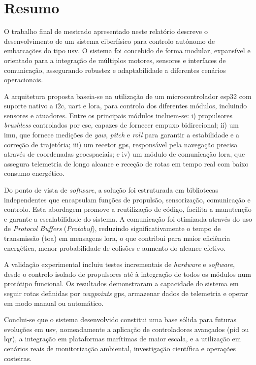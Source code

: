 
\chapter{Resumo}

O trabalho final de mestrado apresentado neste relatório descreve o desenvolvimento de um sistema ciberfísico para controlo autónomo de embarcações do tipo \acrfull{usv}. O sistema foi concebido de forma modular, expansível e orientado para a integração de múltiplos motores, sensores e interfaces de comunicação, assegurando robustez e adaptabilidade a diferentes cenários operacionais.

A arquitetura proposta baseia-se na utilização de um microcontrolador \gls{esp32} com suporte nativo a \gls{i2c}, \gls{uart} e \gls{lora}, para controlo dos diferentes módulos, incluindo sensores e atuadores. Entre os principais módulos incluem-se: i) propulsores \emph{brushless} controlados por \acrfull{esc}, capazes de fornecer empuxo bidirecional; ii) um \acrfull{imu}, que fornece medições de \emph{yaw}, \emph{pitch} e \emph{roll} para garantir a estabilidade e a correção de trajetória; iii) um recetor \acrfull{gps}, responsável pela navegação precisa através de coordenadas geoespaciais; e iv) um módulo de comunicação \acrfull{lora}, que assegura telemetria de longo alcance e receção de rotas em tempo real com baixo consumo energético.

Do ponto de vista de \emph{software}, a solução foi estruturada em bibliotecas independentes que encapsulam funções de propulsão, sensorização, comunicação e controlo. Esta abordagem promove a reutilização de código, facilita a manutenção e garante a escalabilidade do sistema. A comunicação foi otimizada através do uso de \emph{Protocol Buffers} (\emph{Protobuf}), reduzindo significativamente o tempo de transmissão (\gls{toa}) em mensagens \acrfull{lora}, o que contribui para maior eficiência energética, menor probabilidade de colisões e aumento do alcance efetivo.

A validação experimental incluiu testes incrementais de \emph{hardware} e \emph{software}, desde o controlo isolado de propulsores até à integração de todos os módulos num protótipo funcional. Os resultados demonstraram a capacidade do sistema em seguir rotas definidas por \emph{waypoints} \acrfull{gps}, armazenar dados de telemetria e operar em modo manual ou automático.

Conclui-se que o sistema desenvolvido constitui uma base sólida para futuras evoluções em \acrfull{usv}, nomeadamente a aplicação de controladores avançados (\acrfull{pid} ou \acrfull{lqr}), a integração em plataformas marítimas de maior escala, e a utilização em cenários reais de monitorização ambiental, investigação científica e operações costeiras.

\vspace{-0.5cm}

